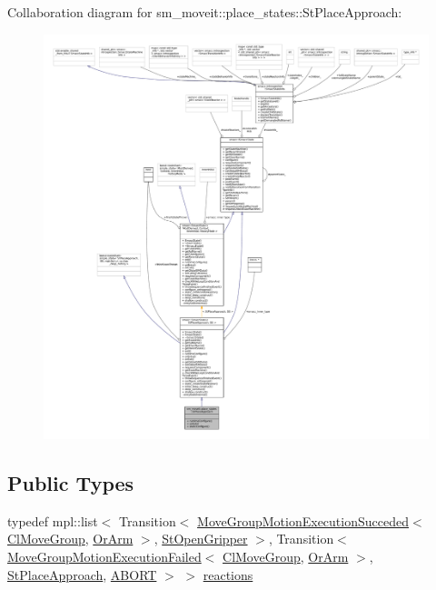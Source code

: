 Collaboration diagram for sm\+\_\+moveit\+:\+:place\+\_\+states\+:\+:St\+Place\+Approach\+:
\nopagebreak
\begin{figure}[H]
\begin{center}
\leavevmode
\includegraphics[width=350pt]{structsm__moveit_1_1place__states_1_1StPlaceApproach__coll__graph}
\end{center}
\end{figure}
\subsection*{Public Types}
\begin{DoxyCompactItemize}
\item 
typedef mpl\+::list$<$ Transition$<$ \hyperlink{structmoveit__z__client_1_1MoveGroupMotionExecutionSucceded}{Move\+Group\+Motion\+Execution\+Succeded}$<$ \hyperlink{classmoveit__z__client_1_1ClMoveGroup}{Cl\+Move\+Group}, \hyperlink{classsm__moveit_1_1OrArm}{Or\+Arm} $>$, \hyperlink{structsm__moveit_1_1place__states_1_1StOpenGripper}{St\+Open\+Gripper} $>$, Transition$<$ \hyperlink{structmoveit__z__client_1_1MoveGroupMotionExecutionFailed}{Move\+Group\+Motion\+Execution\+Failed}$<$ \hyperlink{classmoveit__z__client_1_1ClMoveGroup}{Cl\+Move\+Group}, \hyperlink{classsm__moveit_1_1OrArm}{Or\+Arm} $>$, \hyperlink{structsm__moveit_1_1place__states_1_1StPlaceApproach}{St\+Place\+Approach}, \hyperlink{classABORT}{A\+B\+O\+RT} $>$ $>$ \hyperlink{structsm__moveit_1_1place__states_1_1StPlaceApproach_a8532a592c622e84d25b282e727c1f475}{reactions}
\end{DoxyCompactItemize}
